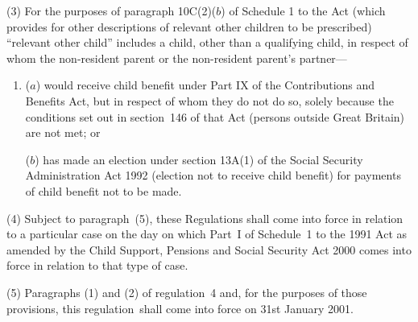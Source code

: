 \documentclass[12pt,a4paper]{article}
\begin{document}

(3) For the purposes of paragraph 10C(2)($b$)  of Schedule 1 to the Act (which provides for other descriptions of relevant other children to be prescribed) “relevant other child” includes a child, other than a qualifying child, in respect of whom the non-resident parent or the non-resident parent’s partner—
\begin{enumerate}\item[]
($a$) would receive child benefit under Part IX of the Contributions and Benefits Act, but in respect of whom they do not do so, solely because the conditions set out in section~146 of that Act (persons outside Great Britain) are not met; or

($b$) has made an election under section 13A(1) of the Social Security Administration Act 1992 (election not to receive child benefit) for payments of child benefit not to be made.
\end{enumerate}

(4) Subject to paragraph~(5), these Regulations shall come into force in relation to a particular case on the day on which Part~I of Schedule~1 to the 1991 Act as amended by the Child Support, Pensions and Social Security Act 2000 comes into force in relation to that type of case.

(5) Paragraphs (1) and (2) of regulation~4 and, for the purposes of those provisions, this regulation~shall come into force on 31st January 2001.
\end{document}
